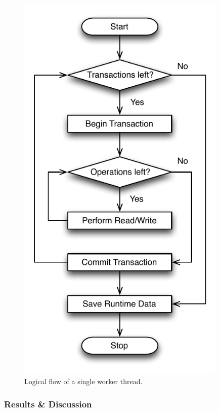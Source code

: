 \begin{figure}[h!]
\begin{minipage}[l]{0.50\textwidth}
    \includegraphics[width=0.89\textwidth]{figures/bench/worker}
    \caption{Logical flow of a single worker thread.}
    \label{fig:eval-worker}
\end{minipage}
\end{figure}

\subsubsection{Results \& Discussion}

